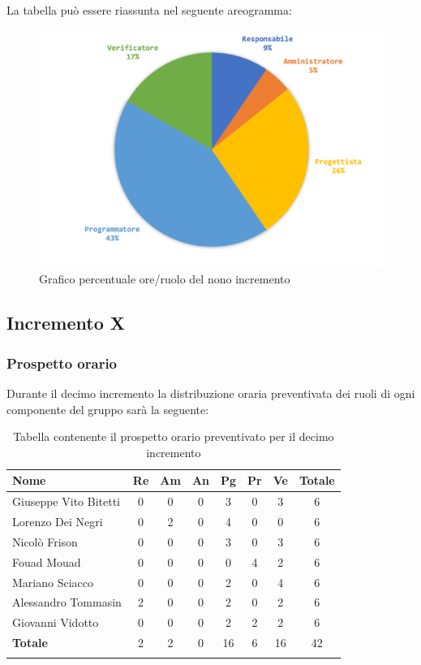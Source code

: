 		La tabella può essere riassunta nel seguente areogramma:
		\begin{figure}[H]
			\centering
			\includegraphics[width=0.8\linewidth]{./images/preventivo/incremento9-2.png}
			\caption{Grafico percentuale ore/ruolo del nono incremento}
			\label{fig:grafico costi ruolo incremento IX}
		\end{figure}
		
		
		
	\subsection{Incremento X}
		\subsubsection{Prospetto orario}
		Durante il decimo incremento la distribuzione oraria preventivata dei ruoli di ogni componente del gruppo sarà la seguente:
		
		\begin{longtable}{|l|c|c|c|c|c|c|c|}
			\hline
			\rowcolor{lighter-grayer}
			\textbf{Nome} & \textbf{Re} & \textbf{Am} & \textbf{An} & \textbf{Pg}  & \textbf{Pr}   & \textbf{Ve} & \textbf{Totale} \\
			\hline
			\endfirsthead
			
			\hline
			Giuseppe Vito Bitetti 		 & 0 & 0 & 0 & 3 & 0 & 3 & 6\\
			\hline
			\hline
			Lorenzo Dei Negri			 & 0 & 2 & 0 & 4 & 0 & 0 & 6\\
			\hline
			\hline
			Nicolò Frison				      & 0 & 0 & 0 & 3 & 0 & 3 & 6\\
			\hline
			\hline
			Fouad Mouad 				   & 0 & 0 & 0 & 0 & 4 & 2 & 6\\
			\hline
			\hline
			Mariano Sciacco 			 & 0 & 0 & 0 & 2 & 0 & 4 & 6\\
			\hline
			\hline
			Alessandro Tommasin    & 2 & 0 & 0 & 2 & 0 & 2 & 6\\
			\hline
			\hline
			Giovanni Vidotto 			  & 0 & 0 & 0 & 2 & 2 & 2 & 6\\
			\hline 
			\textbf{Totale}			 		& 2 & 2 & 0 & 16 & 6 & 16 & 42\\
			\hline
			\caption{Tabella contenente il prospetto orario preventivato per il decimo incremento}
		\end{longtable}
		\pagebreak
		
